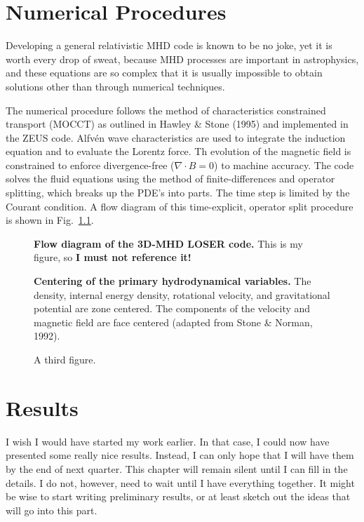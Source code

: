 \documentclass[10pt]{ucscthesisbs}
\begin{document}
\chapter{Numerical Procedures}

Developing a general relativistic MHD code is known to be no joke, yet it is worth every drop of sweat, because MHD processes are important in astrophysics, and these equations are so complex that it is usually impossible to obtain solutions other than through numerical techniques.

The numerical procedure follows the method of characteristics constrained transport (MOCCT) as outlined in Hawley \& Stone (1995) and implemented in the ZEUS code. Alfv\'en wave characteristics are used to integrate the induction equation and to evaluate the Lorentz force. Th evolution of the magnetic field is constrained to enforce divergence-free ({\boldmath $\nabla \cdot B=0$}) to machine accuracy. The code solves the fluid equations using the method of finite-differences and operator splitting, which breaks up the PDE's into parts. The time step is limited by the Courant condition. A flow diagram of this time-explicit, operator split procedure is shown in Fig.\ \ref {fig:flow}.

\begin{figure}[t!]
 \centerline{
  \epsfxsize=3.8in
 }
\caption[Flow diagram of the 3D-MHD LOSER code]
{{\bf Flow diagram of the 3D-MHD LOSER code. }This is my figure, so {\bf I must not reference it!}}
\label{fig:flow}
\end{figure}


\begin{figure}
\caption{{\bf Centering of the primary hydrodynamical variables.} The density, internal energy density, rotational velocity, and gravitational potential are zone centered. The components of the velocity and magnetic field are face centered (adapted from Stone \& Norman, 1992).}
\end{figure}

\begin{figure}
\caption{A third figure.}
\end{figure}

\chapter{Results}

I wish I would have started my work earlier. In that case, I could now have presented some really nice results. Instead, I can only hope that I will have them by the end of next quarter. This chapter will remain silent until I can fill in the details. I do not, however, need to wait until I have everything together. It might be wise to start writing preliminary results, or at least sketch out the ideas that will go into this part.
\end{document}
